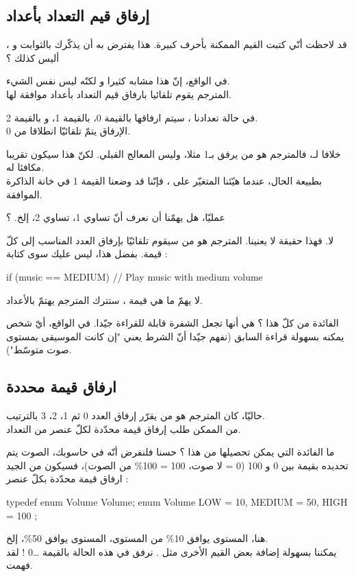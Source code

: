 \subsection{إرفاق قيم التعداد بأعداد}
قد لاحظت أنّي كتبت القيم الممكنة بأحرف كبيرة. هذا يفترض به أن يذكّرك بالثوابت و
،
أليس كذلك ؟

في الواقع، إنّ هذا مشابه كثيرا و لكنّه ليس نفس الشيء.\\
المترجم يقوم تلقائيا بارفاق قيم التعداد بأعداد موافقة لها.


في حالة تعدادنا
،
سيتم ارفاقها بالقيمة 0،
بالقيمة 1،
و
بالقيمة 2.\\
الإرفاق يتمّ تلقائيّا انطلاقا من 0.

خلافا لـ،
فالمترجم هو من يرفق
بـ1 مثلا، وليس المعالج القبلي. لكنّ هذا سيكون تقريبا مكافئا له.\\
بطبيعة الحال، عندما هيّئنا المتغيّر
على
،
فإنّنا قد وضعنا القيمة 1 في خانة الذاكرة الموافقة.

\begin{question}
عمليّا، هل يهمّنا أن نعرف أنّ
تساوي 1،
تساوي 2، إلخ. ؟
\end{question}

لا. فهذا حقيقة لا يعنينا. المترجم هو من سيقوم تلقائيّا بإرفاق العدد المناسب إلى كلّ قيمة. بفضل هذا، ليس عليك سوى كتابة :
\begin{Csource}
if (music == MEDIUM)
{
	// Play music with medium volume
}
\end{Csource}
لا يهمّ ما هي قيمة
،
ستترك المترجم يهتمّ بالأعداد.

الفائدة من كلّ  هذا ؟  هي أنها تجعل الشفرة قابلة للقراءة جيّدا. في الواقع، أيّ شخص يمكنه بسهولة قراءة
السابق (نفهم جيّدا أنّ الشرط يعني "إن كانت الموسيقى بمستوى صوت متوسّط").

\subsection{ارفاق قيمة محددة}
حاليّا، كان المترجم هو من يقرّر إرفاق العدد 0 ثم 1، 2، 3
 بالترتيب.\\
من الممكن طلب إرفاق قيمة محدّدة لكلّ عنصر من التعداد.

ما الفائدة التي يمكن تحصيلها من هذا ؟ حسنا فلنفرض أنّه في حاسوبك، الصوت يتم تحديده بقيمة بين 0 و 100 (0 = لا صوت، 100 = 100\%
من الصوت)، فسيكون من الجيد ارفاق قيمة محدّدة بكلّ عنصر :
\begin{Csource}
typedef enum Volume Volume;
enum Volume
{
	LOW = 10, MEDIUM = 50, HIGH = 100
};
\end{Csource}
هنا، المستوى
يوافق 10\%
من المستوى، المستوى
يوافق 50\%،
إلخ.\\
يمكننا بسهولة إضافة بعض القيم الأخرى مثل
.
نرفق في هذه الحالة
بالقيمة \dots 0 ! لقد فهمت.

